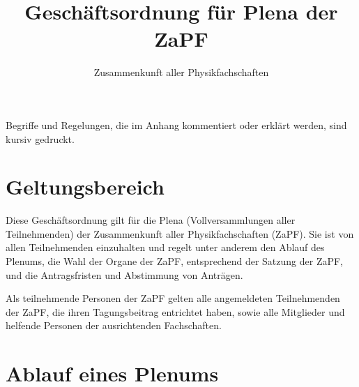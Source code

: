 \documentclass[
  ngerman,
  a4paper,
  oneside]{scrartcl}
\title{Geschäftsordnung für Plena der ZaPF}
\author{Zusammenkunft aller Physikfachschaften}
\date{}
\begin{document}
\maketitle

Begriffe und Regelungen, die im Anhang kommentiert oder erklärt werden,
sind kursiv gedruckt.

\section{Geltungsbereich}\label{geltungsbereich}

Diese Geschäftsordnung gilt für die Plena (Vollversammlungen aller
Teilnehmenden) der Zusammenkunft aller Physikfachschaften (ZaPF). Sie
ist von allen Teilnehmenden einzuhalten und regelt unter anderem den
Ablauf des Plenums, die Wahl der Organe der ZaPF, entsprechend der
Satzung der ZaPF, und die Antragsfristen und Abstimmung von Anträgen.

Als teilnehmende Personen der ZaPF gelten alle angemeldeten
Teilnehmenden der ZaPF, die ihren Tagungsbeitrag entrichtet haben, sowie
alle Mitglieder und helfende Personen der ausrichtenden Fachschaften.

\section{Ablauf eines Plenums}\label{ablauf-eines-plenums}
\end{document}
